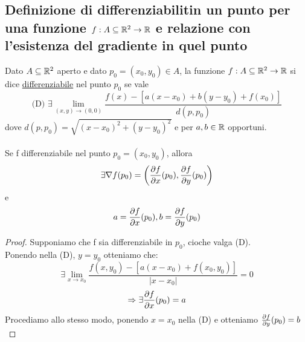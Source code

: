 \subsection{Definizione di differenziabilit\aca in un punto per una funzione $f: A \subseteq \mathbb{R}^2 \to \mathbb{R}$ 
e relazione con l'esistenza del gradiente in quel punto}
\begin{definition}
  Dato $A \subseteq \mathbb{R}^2$ aperto e dato $p_0=(x_0,y_0)\in A$, la funzione $f: A \subseteq \mathbb{R}^2 \to \mathbb{R}$ si dice \underline{differenziabile}
  nel punto $p_0$ se vale 
  $$\text{(D) } \exists \lim_{(x,y)\to (0,0)}\frac{f(x)-\left[a(x-x_0)+b(y-y_0)+f(x_0)\right]}{d(p,p_0)}$$
  dove $d(p,p_0) = \sqrt{(x-x_0)^2+(y-y_0)^2}$ e per $a,b \in \mathbb{R}$ opportuni. \\\\
  Se f \ace differenziabile nel punto $p_0 =(x_0,y_0)$, allora $$\exists\nabla f(p_0) = \left(\frac{\partial f}{\partial x}(p_0), \frac{\partial f}{\partial y}(p_0)\right)$$
  e $$a = \frac{\partial f}{\partial x}(p_0) , b =\frac{\partial f}{\partial y}(p_0) $$
  \begin{proof}
    Supponiamo che f sia differenziabile in $p_0$, cio\ace che valga (D). \\
    Ponendo nella (D), $y = y_0$ otteniamo che:
    $$\exists \lim_{x\to x_0} \frac{f(x,y_0)- \left[a(x-x_0)+f(x_0,y_0)\right]}{\lvert x -x_0\rvert} = 0$$
    $$\Rightarrow \exists\frac{\partial f}{\partial x}(p_0) = a$$
    Procediamo allo stesso modo, ponendo $x=x_0$ nella (D) e otteniamo $\frac{\partial f}{\partial y}(p_0) = b$
  \end{proof}
\end{definition}

